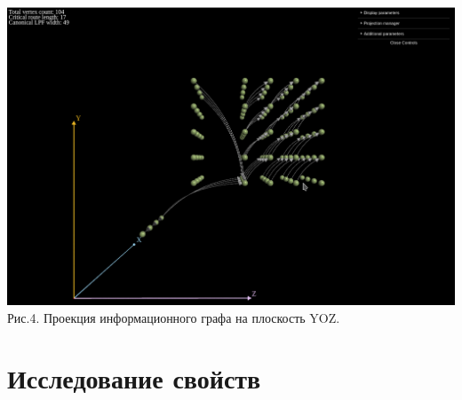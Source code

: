 \documentclass[a4paper, 12pt]{article}
\begin{document}
	\begin{center}
		\includegraphics[scale=0.5]{src/graph_yz.png}\\
		Рис.4. Проекция информационного графа на плоскость YOZ.
	\end{center}

\section{Исследование свойств}
\end{document}
